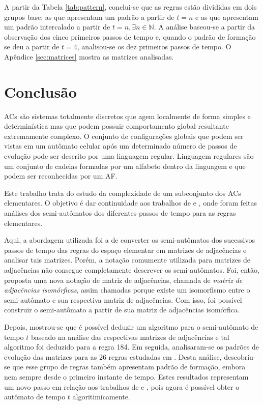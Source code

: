 \documentclass[12pt,a4paper]{article}
\begin{document}
A partir da Tabela \ref{tab:pattern}, conclui-se que as regras estão divididas
em dois grupos base: as que apresentam um padrão a partir de $t=n$ e as que
apresentam um padrão intercalado a partir de $t=n,\exists n \in \mathbb{N}$.
A análise baseou-se a partir da observação dos cinco primeiros passos de
tempo e, quando o padrão de formação se deu a partir de $t=4$, analisou-se
os dez primeiros passos de tempo. O Apêndice \ref{sec:matrices} mostra as
matrizes analisadas. 

\newpage

\section{Conclusão}\label{sec:conclude}

ACs são sistemas totalmente discretos que agem localmente de forma simples
e determinística  mas que podem possuir
comportamento global resultante extremamente complexo. O conjunto de configurações
globais que podem ser vistas em um autômato celular após um determinado
número de passos de evolução pode ser descrito por uma linguagem
regular. Linguagem regulares são um conjunto de cadeias formadas
por um alfabeto dentro da linguagem e que podem ser reconhecidas por um
AF.

Este trabalho trata do estudo da complexidade de um subconjunto dos ACs
elementares. O objetivo é dar continuidade aos trabalhos de
 e , onde foram feitas
análises dos semi-autômatos dos diferentes passos de tempo
para as regras elementares.

Aqui, a abordagem utilizada foi a de converter os semi-autômatos dos sucessivos
passos de tempo das regras do espaço elementar em matrizes de adjacências e analisar
tais matrizes. Porém, a notação comumente utilizada para matrizes de adjacências
não consegue completamente descrever os semi-autômatos. Foi, então, proposta uma
nova notação de matriz de adjacências, chamada de \textit{matriz de
adjacências isomórficas}, assim chamadas porque existe um isomorfismo entre
o semi-autômato e sua respectiva matriz de adjacências. Com isso, foi possível
construir o semi-autômato a partir de sua matriz de adjacências isomórfica.

Depois, mostrou-se que é possível deduzir um algoritmo para o semi-autômato
de tempo $t$ baseado na análise das respectivas matrizes de adjacências e tal
algoritmo foi deduzido para a regra 184. Em seguida, analisaram-se
os padrões de evolução das matrizes para as 26 regras estudadas em
. Desta análise, descobriu-se que esse grupo de regras
também apresentam padrão de formação, embora nem sempre desde o primeiro
instante de tempo. Estes resultados representam um novo passo em relação
aos trabalhos de  e , pois
agora é possível obter o autômato de tempo $t$ algoritimicamente.
\end{document}
